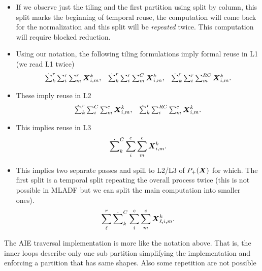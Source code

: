 \documentclass[acmsmall]{acmart}
\begin{document}
\begin{itemize}
\item If we observe just the tiling and the first partition using
  split by column, this split marks the beginning of temporal reuse,
  the computation will come back for the normalization and this split
  will be {\em repeated} twice. This computation will require blocked
  reduction.

\item Using our notation, the following tiling formulations imply
  formal reuse in L1 (we read L1 twice)
  \begin{equation}
    \begin{matrix}
    \dot\sum_k^r\sum_{i}^r\sum_{m}^r{\boldsymbol X}^{k}_{i,m}, & 
    \dot\sum_k^r\sum_{i}^r\sum_{m}^C{\boldsymbol X}^{k}_{i,m}, & 
    \dot\sum_k^r\sum_{i}^r\sum_{m}^{RC}{\boldsymbol X}^{k}_{i,m}. \\
    \end{matrix}
  \end{equation}
  
\item These imply reuse in L2
  \begin{equation}
    \begin{matrix}
    \dot\sum_k^r\sum_{i}^{C}\sum_{m}^c{\boldsymbol X}^{k}_{i,m}, & 
    \dot\sum_k^r\sum_{i}^{RC}\sum_{m}^c{\boldsymbol X}^{k}_{i,m}. \\
    \end{matrix}
  \end{equation}

\item This implies reuse in L3
  \begin{equation}
    \dot\sum_k^{C}\sum_{i}^c\sum_{m}^c{\boldsymbol X}^{k}_{i,m}.
  \end{equation}

\item This implies two separate passes and spill to L2/L3 of
  $P_+({\boldsymbol X})$ for which. The first split is a temporal split
  repeating the overall process twice (this is not possible in MLADF
  but we can split the main computation into smaller ones).
  \begin{equation}
    \sum_\ell^{r}\dot\sum_k^{C}\sum_{i}^c\sum_{m}^c{\boldsymbol X}^{k}_{\ell,i,m}.
  \end{equation}
\end{itemize}

The AIE traversal implementation is more like the notation above. That
is, the inner loops describe only one sub partition simplifying the
implementation and enforcing a partition that has same shapes. Also
some repetition are not possible 
\end{document}
